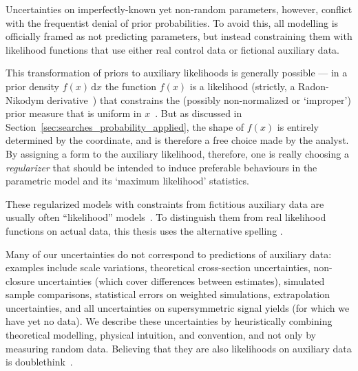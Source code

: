 Uncertainties on imperfectly-known yet non-random parameters, however,
conflict with the frequentist denial of prior probabilities.
To avoid this, all modelling is officially framed as not predicting parameters,
but instead constraining them with likelihood functions that use
either real control data or fictional auxiliary data.

This transformation of priors to auxiliary likelihoods is generally possible
--- in a prior density $f(x)\,\mathrm{d}x$ the function $f(x)$ is a likelihood
(strictly, a Radon-Nikodym derivative~\cite{billingsley2008probability})
that constrains the (possibly non-normalized or `improper') prior measure that
is uniform in $x$~\cite{Cowan:2010js}.
But as discussed in Section~\ref{sec:searches_probability_applied}, the shape
of $f(x)$ is entirely determined by the coordinate, and is therefore a free
choice made by the analyst.
By assigning a form to the auxiliary likelihood, therefore, one is really
choosing a \emph{regularizer} that should be intended to induce preferable
behaviours in the parametric model and its `maximum likelihood' statistics.

These regularized models with constraints from fictitious auxiliary data
are usually often ``likelihood'' models~\cite{
cranmer2012histfactory,
baak2015histfitter,
Besjes_2015,
heinrich2021pyhf
}.
To distinguish them from real likelihood functions on actual data, this
thesis uses the alternative spelling \textbf{\heplikelihood}.

Many of our uncertainties do not correspond to predictions of auxiliary data:
examples include
scale variations,
theoretical cross-section uncertainties,
non-closure uncertainties (which cover differences between estimates),
simulated sample comparisons,
statistical errors on weighted simulations,
extrapolation uncertainties,
and
all uncertainties on supersymmetric signal yields
(for which we have yet no data).
We describe these uncertainties by heuristically
combining theoretical modelling, physical intuition, and convention,
and not only by measuring random data.
Believing that they are also likelihoods on auxiliary data is
doublethink~\cite{orwell1949nnineteen}.

